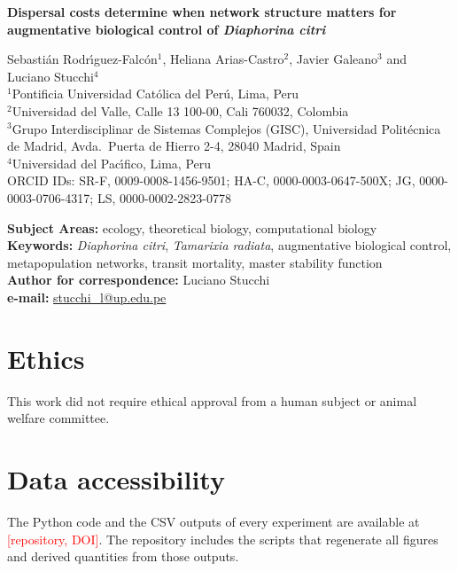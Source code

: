 \documentclass[11pt,a4paper]{article}
\newcommand{\todo}[1]{\textcolor{red}{[#1]}}
\begin{document}
\begin{center}
{\LARGE\bfseries Dispersal costs determine when network structure matters for augmentative biological control of \textit{Diaphorina citri}\par}
\vspace{1em}
Sebasti\'an Rodr\'{\i}guez-Falc\'on$^{1}$, Heliana Arias-Castro$^{2}$, Javier Galeano$^{3}$ and Luciano Stucchi$^{4}$\\[0.8em]
{\small
$^{1}$Pontificia Universidad Cat\'olica del Per\'u, Lima, Peru\\
$^{2}$Universidad del Valle, Calle 13 100-00, Cali 760032, Colombia\\
$^{3}$Grupo Interdisciplinar de Sistemas Complejos (GISC), Universidad Polit\'ecnica de Madrid, Avda.\ Puerta de Hierro 2-4, 28040 Madrid, Spain\\
$^{4}$Universidad del Pac\'{\i}fico, Lima, Peru}\\[0.8em]
{\small ORCID IDs: SR-F, 0009-0008-1456-9501; HA-C, 0000-0003-0647-500X; JG, 0000-0003-0706-4317; LS, 0000-0002-2823-0778}
\end{center}

\noindent\textbf{Subject Areas:} ecology, theoretical biology, computational biology\\
\textbf{Keywords:} \textit{Diaphorina citri}, \textit{Tamarixia radiata}, augmentative biological control, metapopulation networks, transit mortality, master stability function\\
\textbf{Author for correspondence:} Luciano Stucchi\\
\textbf{e-mail:} \href{mailto:stucchi_l@up.edu.pe}{stucchi\_l@up.edu.pe}








\section*{Ethics}
This work did not require ethical approval from a human subject or animal welfare committee.

\section*{Data accessibility}
The Python code and the CSV outputs of every experiment are available at \todo{repository, DOI}. The repository includes the scripts that regenerate all figures and derived quantities from those outputs.
\end{document}
